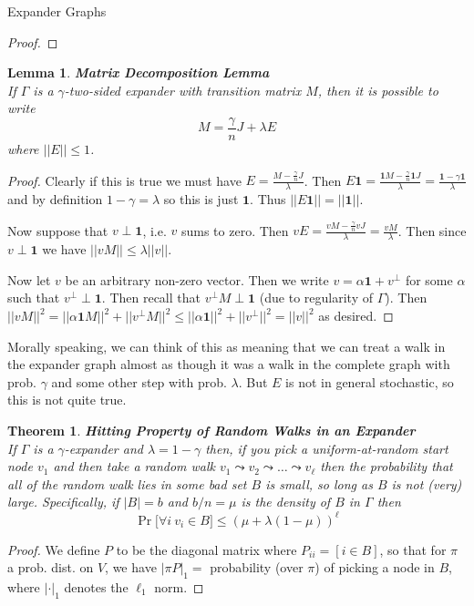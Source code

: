\documentclass{article}
\newtheorem{thm}{Theorem}
\newtheorem{lemma}{Lemma}
\begin{document}
\begin{section}{Expander Graphs}
\begin{proof}
  \end{proof}

  \begin{lemma}{\textbf{Matrix Decomposition Lemma}\\}
  If $\Gamma$ is a $\gamma$-two-sided expander with transition matrix $M$, then it is possible to write
    $$
    M = \frac{\gamma}{n}J + \lambda E
    $$
    where $||E|| \leq 1$.
  \end{lemma}
  \begin{proof}
    Clearly if this is true we must have $E = \frac{M - \frac{\gamma}{n}J}{\lambda}$.
    Then $E\mathbf 1 = \frac{\mathbf 1M - \frac{\gamma}{n}\mathbf 1J}{\lambda} = \frac{\mathbf 1 - \gamma \mathbf 1}{\lambda}$ and by definition $1-\gamma = \lambda$ so this is just $\mathbf 1$.
    Thus $||E\mathbf 1|| = ||\mathbf 1||$.
    
    Now suppose that $v \perp \mathbf 1$, i.e. $v$ sums to zero.
    Then $vE = \frac{vM - \frac{\gamma}{n}vJ}{\lambda} = \frac{vM}{\lambda}$.
    Then since $v \perp \mathbf 1$ we have $||vM|| \leq \lambda||v||$.

    Now let $v$ be an arbitrary non-zero vector.
    Then we write $v = \alpha\mathbf 1 + v^\perp$ for some $\alpha$ such that $v^\perp \perp \mathbf 1$.
    Then recall that $v^\perp M \perp \mathbf 1$ (due to regularity of $\Gamma$).
    Then $||vM||^2 = ||\alpha\mathbf 1M||^2 + ||v^\perp M||^2 \leq ||\alpha \mathbf 1||^2 + ||v^\perp ||^2 = ||v||^2$ as desired.
  \end{proof}

  Morally speaking, we can think of this as meaning that we can treat a walk in the expander graph almost as though it was a walk in the complete graph with prob. $\gamma$ and some other step with prob. $\lambda$.
  But $E$ is not in general stochastic, so this is not quite true.

  \begin{thm}{\textbf{Hitting Property of Random Walks in an Expander}\\}
    If $\Gamma$ is a $\gamma$-expander and $\lambda = 1 - \gamma$ then, if you pick a uniform-at-random start node $v_1$ and then take a random walk $v_1 \leadsto v_2 \leadsto \hdots \leadsto v_\ell$
    then the probability that all of the random walk lies in some bad set $B$ is small, so long as $B$ is not (very) large.
    Specifically, if $|B| = b$ and $b/n = \mu$ is the density of $B$ in $\Gamma$ then
    $$
    \Pr\big[\forall i~v_i \in B\big] \leq (\mu + \lambda (1-\mu))^\ell
    $$
  \end{thm}
  \begin{proof}
    We define $P$ to be the diagonal matrix where $P_{ii} = [i \in B]$, so that for $\pi$ a prob. dist. on $V$, we have $|\pi P|_1 = $ probability (over $\pi$) of picking a node in $B$, where
    $|\cdot|_1$ denotes the $\ell_1$ norm.


\end{proof}
\end{section}
\end{document}

